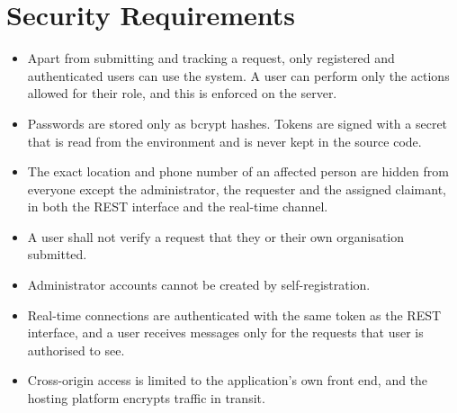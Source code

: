 \documentclass{scrreprt}
\newcounter{fr}
\begin{document}
\section{Security Requirements}
\begin{itemize}
    \item Apart from submitting and tracking a request, only registered and authenticated users can use the system. A user can perform only the actions allowed for their role, and this is enforced on the server.
    \item Passwords are stored only as bcrypt hashes. Tokens are signed with a secret that is read from the environment and is never kept in the source code.
    \item The exact location and phone number of an affected person are hidden from everyone except the administrator, the requester and the assigned claimant, in both the REST interface and the real-time channel.
    \item A user shall not verify a request that they or their own organisation submitted.
    \item Administrator accounts cannot be created by self-registration.
    \item Real-time connections are authenticated with the same token as the REST interface, and a user receives messages only for the requests that user is authorised to see.
    \item Cross-origin access is limited to the application's own front end, and the hosting platform encrypts traffic in transit.
\end{itemize}
\end{document}
